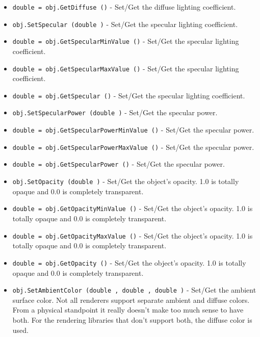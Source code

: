 \begin{itemize}
\item  \verb|double = obj.GetDiffuse ()| -  Set/Get the diffuse lighting coefficient.

\item  \verb|obj.SetSpecular (double )| -  Set/Get the specular lighting coefficient.

\item  \verb|double = obj.GetSpecularMinValue ()| -  Set/Get the specular lighting coefficient.

\item  \verb|double = obj.GetSpecularMaxValue ()| -  Set/Get the specular lighting coefficient.

\item  \verb|double = obj.GetSpecular ()| -  Set/Get the specular lighting coefficient.

\item  \verb|obj.SetSpecularPower (double )| -  Set/Get the specular power.

\item  \verb|double = obj.GetSpecularPowerMinValue ()| -  Set/Get the specular power.

\item  \verb|double = obj.GetSpecularPowerMaxValue ()| -  Set/Get the specular power.

\item  \verb|double = obj.GetSpecularPower ()| -  Set/Get the specular power.

\item  \verb|obj.SetOpacity (double )| -  Set/Get the object's opacity. 1.0 is totally opaque and 0.0 is completely
 transparent.

\item  \verb|double = obj.GetOpacityMinValue ()| -  Set/Get the object's opacity. 1.0 is totally opaque and 0.0 is completely
 transparent.

\item  \verb|double = obj.GetOpacityMaxValue ()| -  Set/Get the object's opacity. 1.0 is totally opaque and 0.0 is completely
 transparent.

\item  \verb|double = obj.GetOpacity ()| -  Set/Get the object's opacity. 1.0 is totally opaque and 0.0 is completely
 transparent.

\item  \verb|obj.SetAmbientColor (double , double , double )| -  Set/Get the ambient surface color. Not all renderers support separate
 ambient and diffuse colors. From a physical standpoint it really
 doesn't make too much sense to have both. For the rendering
 libraries that don't support both, the diffuse color is used.


\end{itemize}
